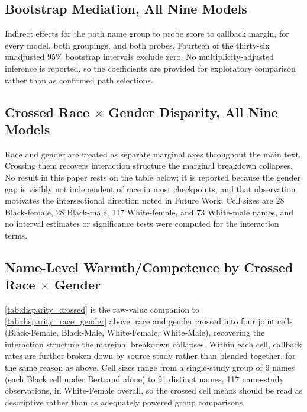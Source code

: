 \documentclass[twocolumn]{article}
\newcommand{\tabledir}{../../results/tables}
\begin{document}
\begin{appendices}


\subsection*{Bootstrap Mediation, All Nine Models}
\label{appx:mediation}
Indirect effects for the path name group to probe score to callback margin,
for every model, both groupings, and both probes. Fourteen of the thirty-six
unadjusted 95\% bootstrap intervals exclude zero. No multiplicity-adjusted
inference is reported, so the coefficients are provided for exploratory
comparison rather than as confirmed path selections.


\clearpage

\subsection*{Crossed Race $\times$ Gender Disparity, All Nine Models}
\label{appx:crossed_disparity}
Race and gender are treated as separate marginal axes throughout the main
text. Crossing them recovers interaction structure the marginal breakdown
collapses. No result in this paper rests on the table below; it is reported
because the gender gap is visibly not independent of race in most
checkpoints, and that observation motivates the intersectional direction
noted in Future Work. Cell sizes are 28 Black-female, 28 Black-male, 117
White-female, and 73 White-male names, and no interval estimates or
significance tests were computed for the interaction terms.


\clearpage

\subsection*{Name-Level Warmth/Competence by Crossed Race $\times$ Gender}

\autoref{tab:disparity_crossed} is the raw-value companion to
\autoref{tab:disparity_race_gender} above: race and gender crossed
into four joint cells (Black-Female, Black-Male, White-Female, White-Male),
recovering the interaction structure the marginal breakdown collapses.
Within each cell, callback rates are further broken down by source study
rather than blended together, for the same reason as above. Cell sizes range
from a single-study group of 9 names (each Black cell under Bertrand alone)
to 91 distinct names, 117 name-study observations, in White-Female overall,
so the crossed cell means should be read as descriptive rather than as
adequately powered group comparisons.



\end{appendices}
\end{document}
